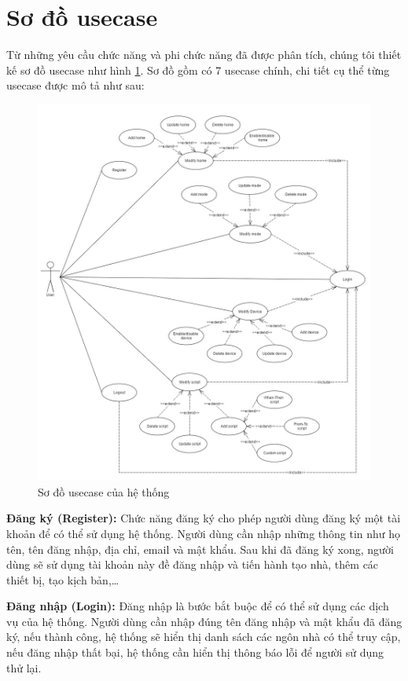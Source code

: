 \documentclass[12pt,a4paper,oneside]{extbook}
\begin{document}
\section{Sơ đồ usecase}

Từ những yêu cầu chức năng và phi chức năng đã được phân tích, chúng tôi thiết kế sơ đồ usecase như hình \ref{fig:2-Usecase}. Sơ đồ gồm có 7 usecase chính, chi tiết cụ thể từng usecase được mô tả như sau:

\begin{figure}[h!]
  \centering
     \includegraphics[width=15cm]{2-Usecase}
  \caption{Sơ đồ usecase của hệ thống}\label{fig:2-Usecase}
\end{figure}

\textbf{Đăng ký (Register):} Chức năng đăng ký cho phép người dùng đăng ký một tài khoản để có thể sử dụng hệ thống. Người dùng cần nhập những thông tin như họ tên, tên đăng nhập, địa chỉ, email và mật khẩu. Sau khi đã đăng ký xong, người dùng sẽ sử dụng tài khoản này đề đăng nhập và tiến hành tạo nhà, thêm các thiết bị, tạo kịch bản,\dots

\textbf{Đăng nhập (Login):} Đăng nhập là bước bắt buộc để có thể sử dụng các dịch vụ của hệ thống. Người dùng cần nhập đúng tên đăng nhập và mật khẩu đã đăng ký, nếu thành công, hệ thống sẽ hiển thị danh sách các ngôn nhà có thể truy cập, nếu đăng nhập thất bại, hệ thống cần hiển thị thông báo lỗi để người sử dụng thử lại.
\end{document}
